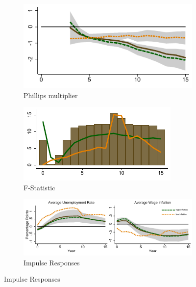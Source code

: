 \documentclass[12pt]{article}
\begin{document}
\begin{appendices}
\begin{singlespace}
\begin{figure}[h!]
    \centering
	\caption{State-Dependent Phillips multiplier and IRFs}
	\label{F:Multiplier_SD_App}
	\begin{subfigure}[b]{0.4\textwidth}
		\caption{Phillips multiplier}
		\label{F2:Multiplier_MM}
		\includegraphics[width=\textwidth]{../Output/Figures/Figure_A8a.pdf}	
	\end{subfigure}
	\begin{subfigure}[b]{0.4\textwidth}
		\caption{F-Statistic}
		\label{F2:Multiplier_FF}
		\includegraphics[width=\textwidth]{../Output/Figures/Figure_A8b.pdf}
	\end{subfigure}
	\begin{subfigure}[b]{0.8\textwidth}
		\caption{Impulse Responses}
		\label{F2:Dynamics_DD}
		\includegraphics[width=\textwidth]{../Output/Figures/Figure_A8c.pdf}

\end{subfigure}
\end{figure}
\end{singlespace}
\end{appendices}
\end{document}
